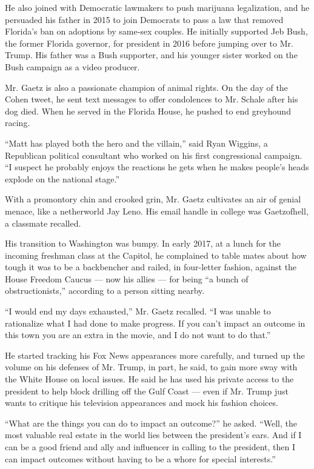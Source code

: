 He also joined with Democratic lawmakers to push marijuana legalization,
and he persuaded his father in 2015 to join Democrats to pass a law that
removed Florida's ban on adoptions by same-sex couples. He initially
supported Jeb Bush, the former Florida governor, for president in 2016
before jumping over to Mr. Trump. His father was a Bush supporter, and
his younger sister worked on the Bush campaign as a video producer.

Mr. Gaetz is also a passionate champion of animal rights. On the day of
the Cohen tweet, he sent text messages to offer condolences to Mr.
Schale after his dog died. When he served in the Florida House, he
pushed to end greyhound racing.

``Matt has played both the hero and the villain,'' said Ryan Wiggins, a
Republican political consultant who worked on his first congressional
campaign. ``I suspect he probably enjoys the reactions he gets when he
makes people's heads explode on the national stage.''

With a promontory chin and crooked grin, Mr. Gaetz cultivates an air of
genial menace, like a netherworld Jay Leno. His email handle in college
was Gaetzofhell, a classmate recalled.

His transition to Washington was bumpy. In early 2017, at a lunch for
the incoming freshman class at the Capitol, he complained to table mates
about how tough it was to be a backbencher and railed, in four-letter
fashion, against the House Freedom Caucus --- now his allies --- for
being ``a bunch of obstructionists,'' according to a person sitting
nearby.

``I would end my days exhausted,'' Mr. Gaetz recalled. ``I was unable to
rationalize what I had done to make progress. If you can't impact an
outcome in this town you are an extra in the movie, and I do not want to
do that.''

He started tracking his Fox News appearances more carefully, and turned
up the volume on his defenses of Mr. Trump, in part, he said, to gain
more sway with the White House on local issues. He said he has used his
private access to the president to help block drilling off the Gulf
Coast --- even if Mr. Trump just wants to critique his television
appearances and mock his fashion choices.

``What are the things you can do to impact an outcome?'' he asked.
``Well, the most valuable real estate in the world lies between the
president's ears. And if I can be a good friend and ally and influencer
in calling to the president, then I can impact outcomes without having
to be a whore for special interests.''


